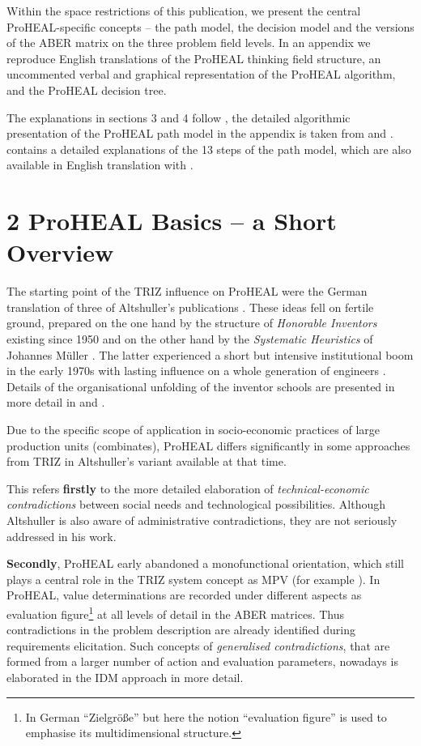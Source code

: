 \documentclass[12pt,a4paper]{article}
\begin{document}
Within the space restrictions of this publication, we present the central
ProHEAL-specific concepts – the path model, the decision model and the
versions of the ABER matrix on the three problem field levels. In an appendix
we reproduce English translations of the ProHEAL thinking field structure, an
uncommented verbal and graphical representation of the ProHEAL algorithm, and
the ProHEAL decision tree.

The explanations in sections 3 and 4 follow \cite[part 2, ch. 4]{14}, the
detailed algorithmic presentation of the ProHEAL path model in the appendix is
taken from \cite{13} and \cite{15}.  \cite[ch. 5]{15} contains a detailed
explanations of the 13 steps of the path model, which are also available in
English translation with \cite{8}.

\section*{2 ProHEAL Basics – a Short Overview}

The starting point of the TRIZ influence on ProHEAL were the German
translation of three of Altshuller’s publications \cite{1,2,3}. These ideas
fell on fertile ground, prepared on the one hand by the structure of
\emph{Honorable Inventors} existing since 1950 and on the other hand by the
\emph{Systematic Heuristics} of Johannes Müller \cite{10,11}. The latter
experienced a short but intensive institutional boom in the early 1970s with
lasting influence on a whole generation of engineers \cite{9}. Details of the
organisational unfolding of the inventor schools are presented in more detail
in \cite{6,7} and \cite{14}.

Due to the specific scope of application in socio-economic practices of large
production units (combinates), ProHEAL differs significantly in some
approaches from TRIZ in Altshuller’s variant available at that time.

This refers \textbf{firstly} to the more detailed elaboration of
\emph{technical-economic contradictions} between social needs and
technological possibilities. Although Altshuller is also aware of
administrative contradictions, they are not seriously addressed in his work.

\textbf{Secondly}, ProHEAL early abandoned a monofunctional orientation, which
still plays a central role in the TRIZ system concept as MPV (for example
\cite{12}). In ProHEAL, value determinations are recorded under different
aspects as evaluation figure\footnote{In German “Zielgröße” but here the
  notion “evaluation figure” is used to emphasise its multidimensional
  structure.} at all levels of detail in the ABER matrices. Thus
contradictions in the problem description are already identified during
requirements elicitation. Such concepts of \emph{generalised contradictions},
that are formed from a larger number of action and evaluation parameters,
nowadays is elaborated in the IDM approach \cite{5} in more detail.
\end{document}
